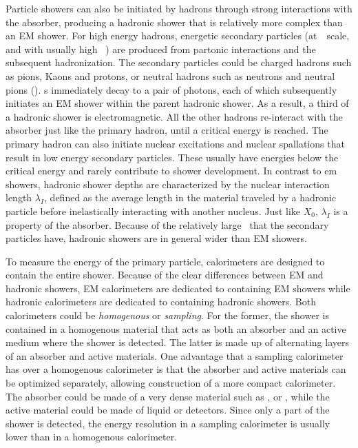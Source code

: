 \par  Particle showers can also be initiated by hadrons through strong interactions with the absorber,
producing a hadronic shower that is relatively more complex than an EM shower.   
For high energy hadrons, energetic secondary particles (at~\GeV\ scale, and with 
usually high \pT~) are produced from partonic interactions and the subsequent hadronization. The secondary particles could 
be charged hadrons such as pions, Kaons and protons, or neutral hadrons 
such as neutrons and neutral pions (\pizero). \pizero s immediately decay to a pair of photons, 
each of which subsequently initiates an EM shower within the parent hadronic 
shower. As a result, a third of a hadronic shower is electromagnetic. 
All the other hadrons re-interact with the absorber just like the primary hadron, 
until a critical energy is reached. The primary hadron can also initiate nuclear excitations 
 and nuclear spallations that result in low energy secondary particles. These usually 
have energies below the critical energy and rarely contribute to shower development. 
In contrast to em showers, hadronic shower depths are characterized by the nuclear interaction length 
$\lambda_{I}$, defined as the average length in the material traveled by a hadronic particle before
 inelastically interacting with another nucleus. Just like $X_0$, $\lambda_{I}$ is a property of the absorber.
Because of the relatively large \pT\ that the secondary particles have, hadronic showers 
are in general wider than EM showers.

%
%
\par To measure the energy of the primary particle, calorimeters are designed to contain the 
entire shower. Because of the clear differences between EM and hadronic showers, EM calorimeters 
are dedicated to containing EM showers while hadronic calorimeters are dedicated to containing 
hadronic showers. Both calorimeters could be {\it homogenous} or {\it sampling}. For the former, the shower is 
contained in a homogenous material that acts as both an absorber and an active medium where 
the shower is detected. The latter is made up of alternating layers of an absorber and active materials. 
One advantage that a sampling calorimeter 
has over a homogenous calorimeter is that the absorber and active materials can be 
optimized separately, allowing construction of a more compact calorimeter. The absorber 
could be made of a very dense material such as ,  or , while the active 
material could be made of liquid  or  detectors. Since only a part of the shower is 
detected, the energy resolution in a sampling calorimeter is usually lower than in 
a homogenous calorimeter. 

